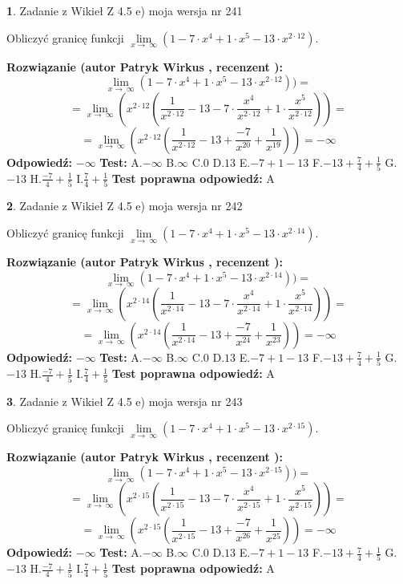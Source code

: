 \documentclass[12pt, a4paper]{article}
\theoremstyle{definition} %
\newtheorem{zad}{}
\newcommand{\zadStart}[1]{\begin{zad}#1\newline}
\newcommand{\zadStop}{\end{zad}}
\newcommand{\rozwStart}[2]{\noindent \textbf{Rozwiązanie (autor #1 , recenzent #2): }\newline}
\newcommand{\rozwStop}{\newline}
\newcommand{\odpStart}{\noindent \textbf{Odpowiedź:}\newline}
\newcommand{\odpStop}{\newline}
\newcommand{\testStart}{\noindent \textbf{Test:}\newline}
\newcommand{\testStop}{\newline}
\newcommand{\kluczStart}{\noindent \textbf{Test poprawna odpowiedź:}\newline}
\newcommand{\kluczStop}{\newline}
\begin{document}
\zadStart{Zadanie z Wikieł Z 4.5 e) moja wersja nr 241}



Obliczyć granicę funkcji  $\lim\limits_{x\to\ \infty}(1 - 7 \cdot x^{4}+1 \cdot x^{5}- 13 \cdot x^{2\cdot12})$.
\zadStop
\rozwStart{Patryk Wirkus}{}
$$\lim\limits_{x\to\ \infty}(1 - 7 \cdot x^{4}+1 \cdot x^{5}- 13 \cdot x^{2\cdot12}))=$$
$$=\lim\limits_{x\to\ \infty}(x^{2\cdot12}(\frac{1}{x^{2\cdot12}}-13 -7 \cdot \frac{x^{4}}{x^{2\cdot12}}+1 \cdot \frac{x^{5}}{x^{2\cdot12}}))=$$
$$=\lim\limits_{x\to\ \infty}(x^{2\cdot12}(\frac{1}{x^{2\cdot12}}-13 + \frac{-7}{x^{20}}+ \frac{1}{x^{19}}))=-\infty$$
\rozwStop
\odpStart
$-\infty$
\odpStop
\testStart
A.$-\infty$ B.$\infty$ C.$0$ D.$13$ E.$-7 + 1 - 13$
F.$-13+\frac{7}{4}+\frac{1}{5}$ G.$-13$
H.$\frac{-7}{4}+\frac{1}{5}$
I.$\frac{7}{4}+\frac{1}{5}$
\testStop
\kluczStart
A
\kluczStop



\zadStart{Zadanie z Wikieł Z 4.5 e) moja wersja nr 242}



Obliczyć granicę funkcji  $\lim\limits_{x\to\ \infty}(1 - 7 \cdot x^{4}+1 \cdot x^{5}- 13 \cdot x^{2\cdot14})$.
\zadStop
\rozwStart{Patryk Wirkus}{}
$$\lim\limits_{x\to\ \infty}(1 - 7 \cdot x^{4}+1 \cdot x^{5}- 13 \cdot x^{2\cdot14}))=$$
$$=\lim\limits_{x\to\ \infty}(x^{2\cdot14}(\frac{1}{x^{2\cdot14}}-13 -7 \cdot \frac{x^{4}}{x^{2\cdot14}}+1 \cdot \frac{x^{5}}{x^{2\cdot14}}))=$$
$$=\lim\limits_{x\to\ \infty}(x^{2\cdot14}(\frac{1}{x^{2\cdot14}}-13 + \frac{-7}{x^{24}}+ \frac{1}{x^{23}}))=-\infty$$
\rozwStop
\odpStart
$-\infty$
\odpStop
\testStart
A.$-\infty$ B.$\infty$ C.$0$ D.$13$ E.$-7 + 1 - 13$
F.$-13+\frac{7}{4}+\frac{1}{5}$ G.$-13$
H.$\frac{-7}{4}+\frac{1}{5}$
I.$\frac{7}{4}+\frac{1}{5}$
\testStop
\kluczStart
A
\kluczStop



\zadStart{Zadanie z Wikieł Z 4.5 e) moja wersja nr 243}



Obliczyć granicę funkcji  $\lim\limits_{x\to\ \infty}(1 - 7 \cdot x^{4}+1 \cdot x^{5}- 13 \cdot x^{2\cdot15})$.
\zadStop
\rozwStart{Patryk Wirkus}{}
$$\lim\limits_{x\to\ \infty}(1 - 7 \cdot x^{4}+1 \cdot x^{5}- 13 \cdot x^{2\cdot15}))=$$
$$=\lim\limits_{x\to\ \infty}(x^{2\cdot15}(\frac{1}{x^{2\cdot15}}-13 -7 \cdot \frac{x^{4}}{x^{2\cdot15}}+1 \cdot \frac{x^{5}}{x^{2\cdot15}}))=$$
$$=\lim\limits_{x\to\ \infty}(x^{2\cdot15}(\frac{1}{x^{2\cdot15}}-13 + \frac{-7}{x^{26}}+ \frac{1}{x^{25}}))=-\infty$$
\rozwStop
\odpStart
$-\infty$
\odpStop
\testStart
A.$-\infty$ B.$\infty$ C.$0$ D.$13$ E.$-7 + 1 - 13$
F.$-13+\frac{7}{4}+\frac{1}{5}$ G.$-13$
H.$\frac{-7}{4}+\frac{1}{5}$
I.$\frac{7}{4}+\frac{1}{5}$
\testStop
\kluczStart
A
\kluczStop
\end{document}
